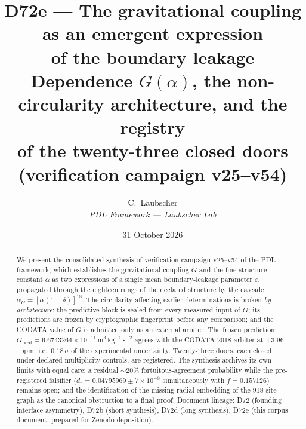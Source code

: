 \documentclass[11pt,a4paper]{article}
\title{\textbf{D72e --- The gravitational coupling as an emergent expression\\ of the boundary leakage}\\[4pt]
\large Dependence $G(\alpha)$, the non-circularity architecture, and the registry\\ of the twenty-three closed doors (verification campaign v25--v54)}
\author{C.~Laubscher\\ \textit{PDL Framework --- Laubscher Lab}}
\date{31 October 2026}
\begin{document}
\sloppy
\maketitle

\begin{abstract}
\noindent
We present the consolidated synthesis of verification campaign v25--v54 of the PDL framework, which establishes the gravitational coupling $G$ and the fine-structure constant $\alpha$ as two expressions of a single mean boundary-leakage parameter $\varepsilon$, propagated through the eighteen rungs of the declared structure by the cascade $\alpha_G = [\alpha(1+\delta)]^{18}$. The circularity affecting earlier determinations is broken \emph{by architecture}: the predictive block is sealed from every measured input of $G$; its predictions are frozen by cryptographic fingerprint before any comparison; and the CODATA value of $G$ is admitted only as an external arbiter. The frozen prediction $G_{\mathrm{pred}} = 6.6743264\times10^{-11}\,\mathrm{m^3\,kg^{-1}\,s^{-2}}$ agrees with the CODATA 2018 arbiter at $+3.96$~ppm, i.e.\ $0.18\,\sigma$ of the experimental uncertainty. Twenty-three doors, each closed under declared multiplicity controls, are registered. The synthesis archives its own limits with equal care: a residual $\sim$20\% fortuitous-agreement probability while the pre-registered falsifier ($d_r = 0.04795969 \pm 7\times10^{-8}$ simultaneously with $f = 0.157126$) remains open; and the identification of the missing radial embedding of the 918-site graph as the canonical obstruction to a final proof. Document lineage: D72 (founding interface asymmetry), D72b (short synthesis), D72d (long synthesis), D72e (this corpus document, prepared for Zenodo deposition).
\end{abstract}
\end{document}
